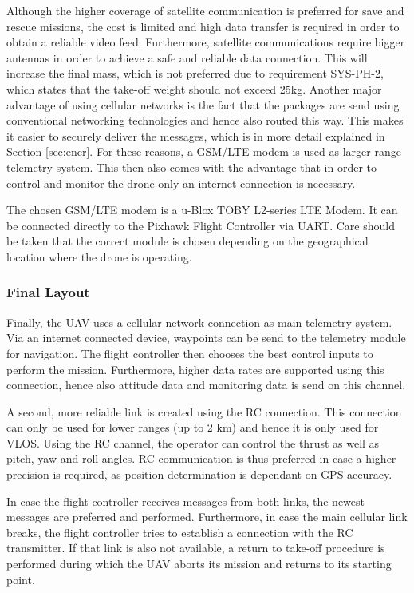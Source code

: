 Although the higher coverage of satellite communication is preferred for save and rescue missions, the cost is limited and high data transfer is required in order to obtain a reliable video feed. Furthermore, satellite communications require bigger antennas in order to achieve a safe and reliable data connection. This will increase the final mass, which is not preferred due to requirement SYS-PH-2, which states that the take-off weight should not exceed 25kg. Another major advantage of using cellular networks is the fact that the packages are send using conventional networking technologies and hence also routed this way. This makes it easier to securely deliver the messages, which is in more detail explained in Section \ref{sec:encr}. For these reasons, a GSM/LTE modem is used as larger range telemetry system. This then also comes with the advantage that in order to control and monitor the drone only an internet connection is necessary.

The chosen GSM/LTE modem is a u-Blox TOBY L2-series LTE Modem. It can be connected directly to the Pixhawk Flight Controller via UART. Care should be taken that the correct module is chosen depending on the geographical location where the drone is operating. 

\subsubsection{Final Layout}

Finally, the UAV uses a cellular network connection as main telemetry system. Via an internet connected device, waypoints can be send to the telemetry module for navigation. The flight controller then chooses the best control inputs to perform the mission. Furthermore, higher data rates are supported using this connection, hence also attitude data and monitoring data is send on this channel.

A second, more reliable link is created using the RC connection. This connection can only be used for lower ranges (up to 2 km) and hence it is only used for VLOS. Using the RC channel, the operator can control the thrust as well as pitch, yaw and roll angles. RC communication is thus preferred in case a higher precision is required, as position determination is dependant on GPS accuracy. 

In case the flight controller receives messages from both links, the newest messages are preferred and performed. Furthermore, in case the main cellular link breaks, the flight controller tries to establish a connection with the RC transmitter. If that link is also not available, a return to take-off procedure is performed during which the UAV aborts its mission and returns to its starting point. 


